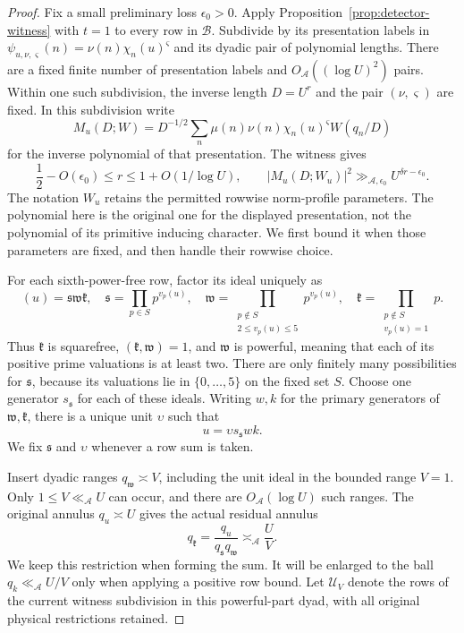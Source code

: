 \documentclass[11pt,a4paper]{article}
\numberwithin{equation}{section}
\numberwithin{figure}{section}
\theoremstyle{definition}
\theoremstyle{remark}
\begin{document}
\begin{proof}
Fix a small preliminary loss $\epsilon_0>0$.  Apply
Proposition~\ref{prop:detector-witness} with $t=1$ to every row in
$\mathcal B$.  Subdivide by its presentation labels in
$\psi_{u,\nu,\varsigma}(n)=\nu(n)\chi_n(u)^{\varsigma}$ and its dyadic
pair of polynomial lengths.  There are a fixed finite number of
presentation labels and $O_{\mathcal A}((\log U)^2)$ pairs.  Within one such
subdivision, the inverse length $D=U^r$ and the pair $(\nu,\varsigma)$
are fixed.  In this subdivision write
\[
 M_u(D;W)=D^{-1/2}\sum_n\mu(n)\nu(n)\chi_n(u)^{\varsigma}W(q_n/D)
\]
for the inverse polynomial of that presentation.  The witness gives
\begin{equation}\label{eq:sextic-witness-spike}
 \frac12-O(\epsilon_0)\le r\le1+O(1/\log U),
 \qquad |M_u(D;W_u)|^2\gg_{\mathcal A,\epsilon_0}
       U^{\delta r-\epsilon_0}.
\end{equation}
The notation $W_u$ retains the permitted rowwise norm-profile parameters.
The polynomial here is the original one for the displayed presentation,
not the polynomial of its primitive inducing character.  We first bound
it when those parameters are fixed, and then handle their rowwise choice.

For each sixth-power-free row, factor its ideal uniquely as
\[
 (u)=\mathfrak s\mathfrak w\mathfrak k,
 \quad
 \mathfrak s=\prod_{p\in S}p^{v_p(u)},\quad
 \mathfrak w=\prod_{\substack{p\notin S\\2\le v_p(u)\le5}}p^{v_p(u)},
 \quad
 \mathfrak k=\prod_{\substack{p\notin S\\v_p(u)=1}}p.
\]
Thus $\mathfrak k$ is squarefree, $(\mathfrak k,\mathfrak w)=1$, and
$\mathfrak w$ is powerful, meaning that each of its positive prime
valuations is at least two.  There are only finitely many possibilities
for $\mathfrak s$, because its valuations lie in $\{0,\ldots,5\}$ on
the fixed set $S$.  Choose one generator $s_{\mathfrak s}$ for each of
these ideals.  Writing $w,k$ for the primary generators of
$\mathfrak w,\mathfrak k$, there is a unique unit $\upsilon$ such that
\[
 u=\upsilon s_{\mathfrak s}wk.
\]
We fix $\mathfrak s$ and $\upsilon$ whenever a row sum is taken.

Insert dyadic ranges $q_{\mathfrak w}\asymp V$, including the unit ideal
in the bounded range $V=1$.  Only $1\le V\ll_{\mathcal A}U$ can occur,
and there are $O_{\mathcal A}(\log U)$ such ranges.  The original annulus
$q_u\asymp U$ gives the actual residual annulus
\begin{equation}\label{eq:sextic-actual-row-annulus}
 q_{\mathfrak k}=\frac{q_u}{q_{\mathfrak s}q_{\mathfrak w}}
       \asymp_{\mathcal A}\frac UV.
\end{equation}
We keep this restriction when forming the sum.  It will be enlarged to
the ball $q_k\ll_{\mathcal A}U/V$ only when applying a positive row bound.
Let $\mathcal U_V$ denote the rows of the current witness subdivision in
this powerful-part dyad, with all original physical restrictions retained.


\end{proof}
\end{document}
